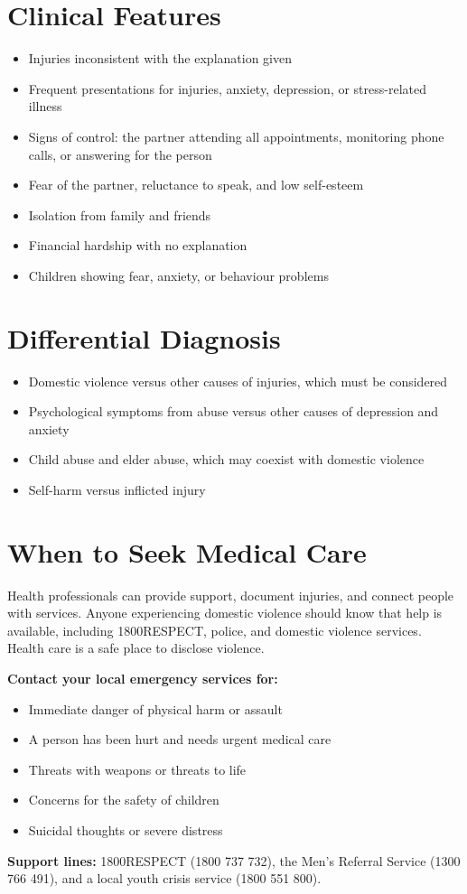 \section*{Clinical Features}
\begin{itemize}
    \item Injuries inconsistent with the explanation given
    \item Frequent presentations for injuries, anxiety, depression, or stress-related illness
    \item Signs of control: the partner attending all appointments, monitoring phone calls, or answering for the person
    \item Fear of the partner, reluctance to speak, and low self-esteem
    \item Isolation from family and friends
    \item Financial hardship with no explanation
    \item Children showing fear, anxiety, or behaviour problems
\end{itemize}

\section*{Differential Diagnosis}
\begin{itemize}
    \item Domestic violence versus other causes of injuries, which must be considered
    \item Psychological symptoms from abuse versus other causes of depression and anxiety
    \item Child abuse and elder abuse, which may coexist with domestic violence
    \item Self-harm versus inflicted injury
\end{itemize}

\section*{When to Seek Medical Care}
Health professionals can provide support, document injuries, and connect people with services. Anyone experiencing domestic violence should know that help is available, including 1800RESPECT, police, and domestic violence services. Health care is a safe place to disclose violence.

\textbf{Contact your local emergency services for:}
\begin{itemize}
    \item Immediate danger of physical harm or assault
    \item A person has been hurt and needs urgent medical care
    \item Threats with weapons or threats to life
    \item Concerns for the safety of children
    \item Suicidal thoughts or severe distress
\end{itemize}
\textbf{Support lines:} 1800RESPECT (1800 737 732), the Men's Referral Service (1300 766 491), and a local youth crisis service (1800 551 800).

